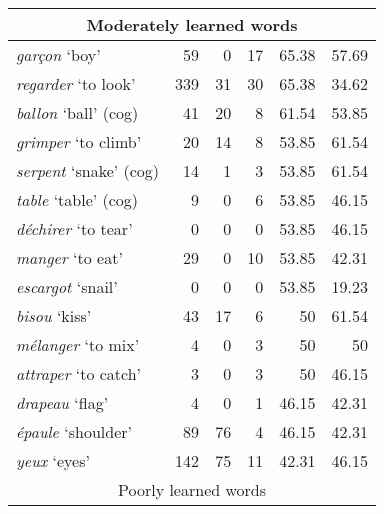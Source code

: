 \documentclass[output=paper]{langscibook}
\begin{document}
\begin{longtable}{lrrrrr}
    \midrule
    \multicolumn{6}{c}{Moderately learned words}\\
    \midrule
    
    \textit{garçon} `boy' &	59 &	0	& 17	& 65.38	& 57.69\\
    \textit{regarder} `to look' &	339 &	31	& 30	& 65.38 &	34.62\\
    \textit{ballon} `ball' (cog)	& 41 &	20 &	8 &	61.54 &	53.85\\
    \textit{grimper} `to climb' &	20 &	14 &	8	& 53.85 & 	61.54\\
    \textit{serpent} `snake' (cog) &	14 &	1 &	3 &	53.85 &	61.54\\
    \textit{table} `table' (cog) &	9 &	0 &	6 &	53.85 &	46.15\\
    \textit{déchirer} `to tear' &	0 &	0 &	0 &	53.85 &	46.15\\
    \textit{manger} `to eat' &	29 &	0 &	10 &	53.85 &	42.31\\
    \textit{escargot} `snail' &	0 &	0 &	0 &	53.85 &	19.23\\
    \textit{bisou} `kiss' &	43 &	17 &	6 &	50\phantom{.00} &	61.54\\
    \textit{mélanger} `to mix'	& 4	& 0	& 3	& 50\phantom{.00} &	50\phantom{.00}\\
    \textit{attraper} `to catch' & 	3 &	0 &	3 &	50\phantom{.00} &	46.15\\
    \textit{drapeau} `flag' &	4 &	0 &	1 &	46.15 &	42.31\\
    \textit{épaule} `shoulder' &	89 &	76 &	4 &	46.15 &	42.31\\
    \textit{yeux} `eyes'	& 142 &	75 &	11 &	42.31 &	46.15\\
    
    
    \midrule
    \multicolumn{6}{c}{Poorly learned words}\\
    \midrule


\end{longtable}
\end{document}

